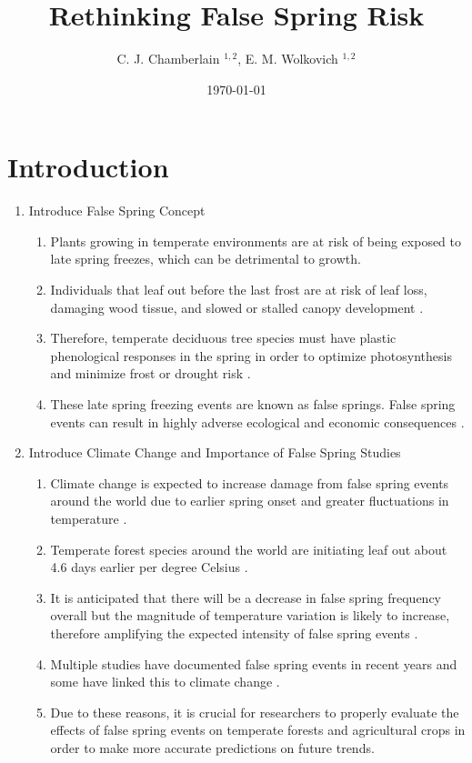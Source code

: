 \documentclass{article}\usepackage[]{graphicx}\usepackage[]{color}
\begin{document}
\title{Rethinking False Spring Risk}
\author{C. J. Chamberlain $^{1,2}$, E. M. Wolkovich $^{1,2}$}
\date{\today}
\maketitle 
 

\renewcommand{\thetable}{\arabic{table}}
\renewcommand{\thefigure}{\arabic{figure}}
\renewcommand{\labelitemi}{$-$}

\section*{Introduction}
\begin{enumerate}
\item Introduce False Spring Concept
\begin {enumerate}
\item Plants growing in temperate environments are at risk of being exposed to late spring freezes, which can be detrimental to growth. 
\item Individuals that leaf out before the last frost are at risk of leaf loss, damaging wood tissue, and slowed or stalled canopy development \citep{Gu2008, Hufkens2012}. 
\item Therefore, temperate deciduous tree species must have plastic phenological responses in the spring in order to optimize photosynthesis and minimize frost or drought risk \citep{Polgar2011}. 
\item These late spring freezing events are known as false springs. False spring events can result in highly adverse ecological and economic consequences \citep{Knudson2012, Ault2013}.
\end{enumerate}
\item Introduce Climate Change and Importance of False Spring Studies
\begin{enumerate}
\item Climate change is expected to increase damage from false spring events around the world due to earlier spring onset and greater fluctuations in temperature \citep{Cannell1986, Inouye2008, Martin2010}. 
\item Temperate forest species around the world are initiating leaf out about 4.6 days earlier per degree Celsius \citep{Wolkovich2012, Polgar2014}. 
\item It is anticipated that there will be a decrease in false spring frequency overall but the magnitude of temperature variation is likely to increase, therefore amplifying the expected intensity of false spring events \citep{Kodra2011, Allstadt2015}. 
\item Multiple studies have documented false spring events in recent years \citep{Gu2008, Augspurger2009, Knudson2012, Augspurger2013} and some have linked this to climate change \citep{Ault2013, Allstadt2015, Muffler2016, Xin2016}. 
\item Due to these reasons, it is crucial for researchers to properly evaluate the effects of false spring events on temperate forests and agricultural crops in order to make more accurate predictions on future trends.
\end{enumerate}


\end{enumerate}
\end{document}
